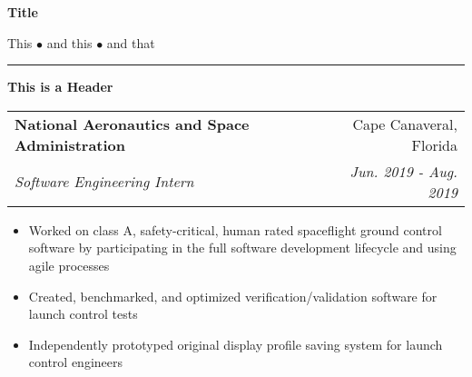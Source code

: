 \documentclass[letterpaper,11pt]{article}
\makeatletter
\newcommand{\resitem}[1]{\item #1 \vspace{-3pt}}
\newcommand{\colfill}{@{\extracolsep{\fill}}}
\newcommand{\ressubheading}[4]{
\begin{tabular*}{6.5in}{l\colfill r}
		\textbf{#1} & #2 \\
		\textit{#3} & \textit{#4} \\
\end{tabular*}\vspace{-6pt}}
\makeatother
\begin{document}
\begin{center}
\textbf{\Large Title}
\end{center}
\vspace{-1.5\baselineskip}
\begin{center}
    This $\bullet$ and this $\bullet$ and that
\end{center}
\vspace{-1.5\baselineskip}
\rule{1.0\textwidth}{1.5pt}
\vspace{0.1\baselineskip}
\newline

\begin{minipage}[t]{0.1\textwidth}
    \textbf{This is a Header}
\end{minipage}
\hspace{0.04\textwidth}
\begin{minipage}[t]{0.8\textwidth}
    \ressubheading{National Aeronautics and Space Administration}{Cape Canaveral, Florida}{Software Engineering Intern}{Jun. 2019 - Aug. 2019}
 	\begin{itemize}
 		\resitem{Worked on class A, safety-critical, human rated spaceflight ground control software by participating in the full software development lifecycle and using agile processes}
        \resitem{Created, benchmarked, and optimized verification/validation software for launch control tests}
 		\resitem{Independently prototyped original display profile saving system for launch control engineers}
 	\end{itemize}
\end{minipage}
\end{document}
